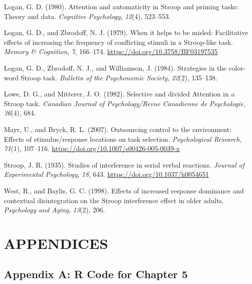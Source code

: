 \documentclass[]{DissertateCUNY}
\begin{document}
\hypertarget{ref-logan_attention_1980}{}
Logan, G. D. (1980). Attention and automaticity in Stroop and priming
tasks: Theory and data. \emph{Cognitive Psychology}, \emph{12}(4),
523--553.

\hypertarget{ref-logan_when_1979}{}
Logan, G. D., and Zbrodoff, N. J. (1979). When it helps to be misled:
Facilitative effects of increasing the frequency of conflicting stimuli
in a Stroop-like task. \emph{Memory \& Cognition}, \emph{7}, 166--174.
\url{https://doi.org/10.3758/BF03197535}

\hypertarget{ref-logan_strategies_1984}{}
Logan, G. D., Zbrodoff, N. J., and Williamson, J. (1984). Strategies in
the color-word Stroop task. \emph{Bulletin of the Psychonomic Society},
\emph{22}(2), 135--138.

\hypertarget{ref-lowe_selective_1982}{}
Lowe, D. G., and Mitterer, J. O. (1982). Selective and divided Attention
in a Stroop task. \emph{Canadian Journal of Psychology/Revue Canadienne
de Psychologie}, \emph{36}(4), 684.

\hypertarget{ref-mayr_outsourcing_2007}{}
Mayr, U., and Bryck, R. L. (2007). Outsourcing control to the
environment: Effects of stimulus/response locations on task selection.
\emph{Psychological Research}, \emph{71}(1), 107--116.
\url{https://doi.org/10.1007/s00426-005-0039-x}

\hypertarget{ref-stroop_studies_1935}{}
Stroop, J. R. (1935). Studies of interference in serial verbal
reactions. \emph{Journal of Experimental Psychology}, \emph{18}, 643.
\url{https://doi.org/10.1037/h0054651}

\hypertarget{ref-west_effects_1998}{}
West, R., and Baylis, G. C. (1998). Effects of increased response
dominance and contextual disintegration on the Stroop interference
effect in older adults. \emph{Psychology and Aging}, \emph{13}(2), 206.

\clearpage

 \fancyhead[R]{\thepage} \fancyfoot[C]{}
\chapter*{APPENDICES} 

\doublespacing

\section*{Appendix A: R Code for Chapter
5}\label{appendix-a-r-code-for-chapter-5}
\end{document}
